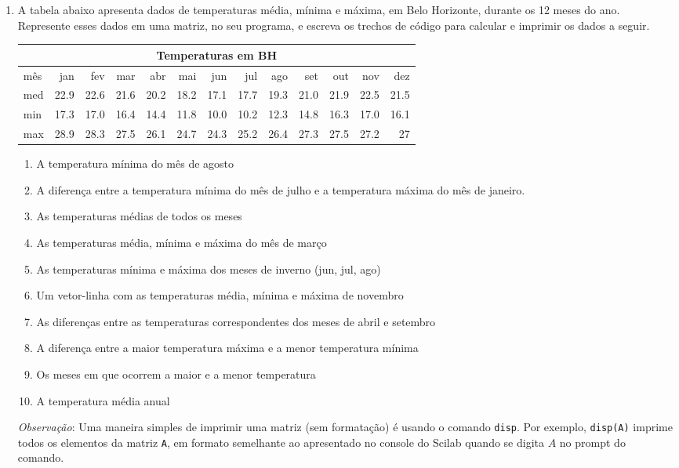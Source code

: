 \documentclass[11pt,fleqn]{practice}
\begin{document}
\begin{enumerate}

\item A tabela abaixo apresenta dados de temperaturas média, mínima e máxima, em Belo Horizonte, durante os 12 meses do ano. Represente esses dados em uma matriz, no seu programa, e escreva os trechos de código para calcular e imprimir os dados a seguir. 
\begin{center}
\begin{tabular}{lrrrrrrrrrrrr} 
   \multicolumn{13}{c}{Temperaturas em BH} \\\hline
   mês      & jan & fev & mar & abr & mai & jun & jul & ago & set & out & nov & dez \\\hline
   med & 22.9 & 22.6 & 21.6 & 20.2 & 18.2 & 17.1 & 17.7 & 19.3 & 21.0 & 21.9 & 22.5 & 21.5 \\
   min  & 17.3 & 17.0 & 16.4 & 14.4 & 11.8 & 10.0 & 10.2 & 12.3 & 14.8 & 16.3 & 17.0 & 16.1 \\
   max & 28.9 & 28.3 & 27.5 & 26.1 & 24.7 & 24.3 & 25.2 & 26.4 & 27.3 & 27.5 & 27.2 & 27
\end{tabular}
\end{center}

\begin{enumerate} 
   \item A temperatura mínima do mês de agosto
   \item A diferença entre a temperatura mínima do mês de julho e a temperatura máxima do mês de janeiro.
   \item As temperaturas médias de todos os meses
   \item As temperaturas média, mínima e máxima do mês de março
   \item As temperaturas mínima e máxima dos meses de inverno (jun, jul, ago)
   \item Um vetor-linha com as temperaturas média, mínima e máxima de novembro
   \item As diferenças entre as temperaturas correspondentes dos meses de abril e setembro
   \item A diferença entre a maior temperatura máxima e a menor temperatura mínima
   \item Os meses em que ocorrem a maior e a menor temperatura 
   \item A temperatura média anual
\end{enumerate}

\emph{Observação\/}: Uma maneira simples de imprimir uma matriz (sem formatação) é usando o comando \texttt{disp}. Por exemplo, \texttt{disp(A)} imprime todos os elementos da matriz \texttt{A}, em formato semelhante ao apresentado no console do Scilab quando se digita $A$ no prompt do comando.

\end{enumerate}

\end{document}

